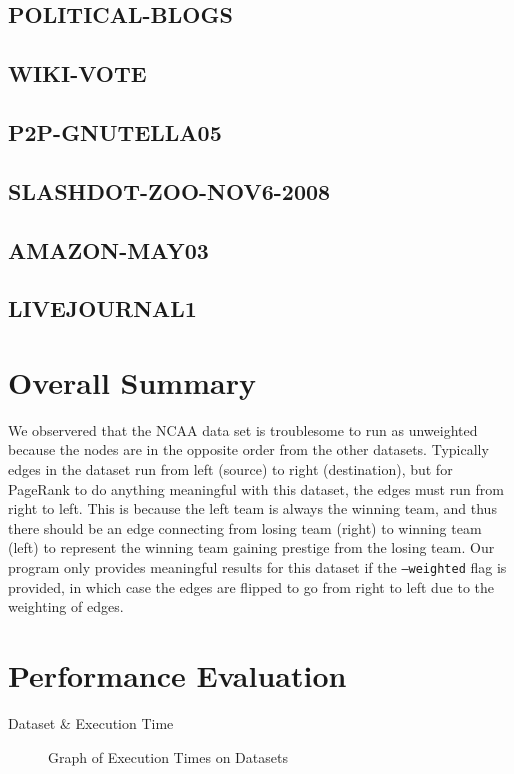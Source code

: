 \documentclass{report}
\begin{document}
\subsection{POLITICAL-BLOGS}
\subsection{WIKI-VOTE}
\subsection{P2P-GNUTELLA05}
\subsection{SLASHDOT-ZOO-NOV6-2008}
\subsection{AMAZON-MAY03}
\subsection{LIVEJOURNAL1}

\section{Overall Summary}
We observered that the NCAA data set is troublesome to run as unweighted because
the nodes are in the opposite order from the other datasets. Typically edges in
the dataset run from left (source) to right (destination), but for PageRank to
do anything meaningful with this dataset, the edges must run from right to left.
This is because the left team is always the winning team, and thus there should
be an edge connecting from losing team (right) to winning team (left) to
represent the winning team gaining prestige from the losing team. Our program
only provides meaningful results for this dataset if the \texttt{--weighted}
flag is provided, in which case the edges are flipped to go from right to left
due to the weighting of edges.

\section{Performance Evaluation}
\begin{table}
  \centering
  \begin{tabular}{}
    \toprule
    Dataset & Execution Time\\
    \midrule
    \bottomrule
  \end{tabular}
  \caption{Execution Times on Datasets}
  \label{execution-times-table}
\end{table}
\begin{figure}
  \centering
  
  \caption{Graph of Execution Times on Datasets}
  \label{execution-times-graph}
\end{figure}
\end{document}

